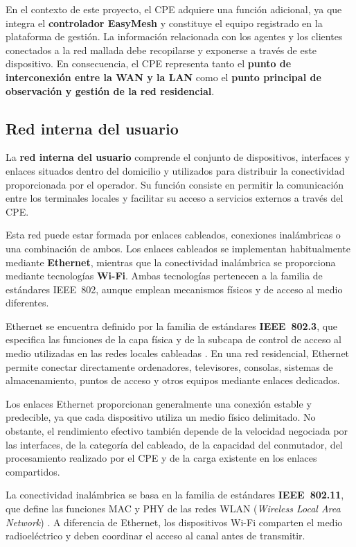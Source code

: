 En el contexto de este proyecto, el CPE adquiere una función adicional,
ya que integra el \textbf{controlador EasyMesh} y constituye el equipo
registrado en la plataforma de gestión. La información relacionada con
los agentes y los clientes conectados a la red mallada debe recopilarse y
exponerse a través de este dispositivo. En consecuencia, el CPE
representa tanto el \textbf{punto de interconexión entre la WAN y la LAN}
como el \textbf{punto principal de observación y gestión de la red
residencial}.

\subsection{Red interna del usuario}
\label{subsec:red-interna-usuario}

La \textbf{red interna del usuario} comprende el conjunto de dispositivos,
interfaces y enlaces situados dentro del domicilio y utilizados para
distribuir la conectividad proporcionada por el operador. Su función
consiste en permitir la comunicación entre los terminales locales y
facilitar su acceso a servicios externos a través del CPE.

Esta red puede estar formada por enlaces cableados, conexiones
inalámbricas o una combinación de ambos. Los enlaces cableados se
implementan habitualmente mediante \textbf{Ethernet}, mientras que la
conectividad inalámbrica se proporciona mediante tecnologías
\textbf{Wi-Fi}. Ambas tecnologías pertenecen a la familia de estándares
IEEE~802, aunque emplean mecanismos físicos y de acceso al medio
diferentes.

Ethernet se encuentra definido por la familia de estándares
\textbf{IEEE~802.3}, que especifica las funciones de la capa física y de
la subcapa de control de acceso al medio utilizadas en las redes locales
cableadas \cite{ieee_8023_2022}. En una red residencial, Ethernet permite
conectar directamente ordenadores, televisores, consolas, sistemas de
almacenamiento, puntos de acceso y otros equipos mediante enlaces
dedicados.

Los enlaces Ethernet proporcionan generalmente una conexión estable y
predecible, ya que cada dispositivo utiliza un medio físico delimitado.
No obstante, el rendimiento efectivo también depende de la velocidad
negociada por las interfaces, de la categoría del cableado, de la
capacidad del conmutador, del procesamiento realizado por el CPE y de la
carga existente en los enlaces compartidos.

La conectividad inalámbrica se basa en la familia de estándares
\textbf{IEEE~802.11}, que define las funciones MAC y PHY de las redes
WLAN (\textit{Wireless Local Area Network})
\cite{ieee_80211_2024}. A diferencia de Ethernet, los dispositivos Wi-Fi
comparten el medio radioeléctrico y deben coordinar el acceso al canal
antes de transmitir.

